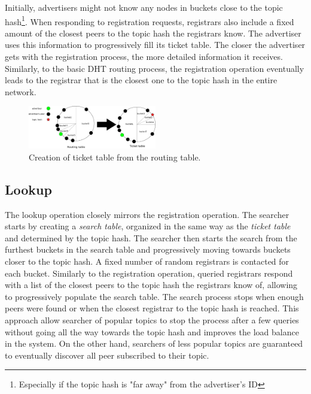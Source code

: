 Initially, advertisers might not know any nodes in buckets close to the topic hash\footnote{Especially if the topic hash is "far away" from the advertiser's ID}. When responding to registration requests, registrars also include a fixed amount of the closest peers to the topic hash the registrars know. The advertiser uses this information to progressively fill its ticket table. The closer the advertiser gets with the registration process, the more detailed information it receives. Similarly, to the basic DHT routing process, the registration operation eventually leads to the registrar that is the closest one to the topic hash in the entire network. 

\begin{figure}
    \includegraphics[width=0.5\textwidth]{img/ticket_table}
    \caption{Creation of ticket table from the routing table.}
    \label{fig:ticket_table}
 \end{figure}

\subsection{Lookup}
The lookup operation closely mirrors the registration operation. The searcher starts by creating a \emph{search table}, organized in the same way as the \emph{ticket table} and determined by the topic hash. The searcher then starts the search from the furthest buckets in the search table and progressively moving towards buckets closer to the topic hash. A fixed number of random registrars is contacted for each bucket. Similarly to the registration operation, queried registrars respond with a list of the closest peers to the topic hash the registrars know of, allowing to progressively populate the search table. The search process stops when enough peers were found or when the closest registrar to the topic hash is reached. This approach allow searcher of popular topics to stop the process after a few queries without going all the way towards the topic hash and improves the load balance in the system. On the other hand, searchers of less popular topics are guaranteed to eventually discover all peer subscribed to their topic. 
\fi
